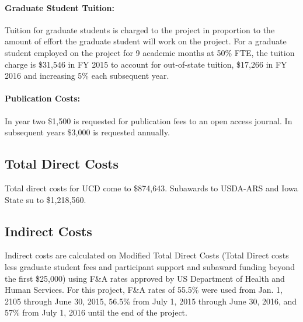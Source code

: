 \paragraph{Graduate Student Tuition:}
Tuition for graduate students is charged to the project in proportion to the amount of effort the graduate student will work on the project. For a graduate student employed on the project for 9 academic months at 50\% FTE, the tuition charge is \$31,546 in FY 2015 to account for out-of-state tuition, \$17,266 in FY 2016 and increasing 5\% each subsequent year.

\paragraph{Publication Costs:}
In year two \$1,500 is requested for publication fees to an open access journal.  In subsequent years \$3,000 is requested annually.

\subsection*{Total Direct Costs}

Total direct costs for UCD come to \$874,643.  Subawards to USDA-ARS and Iowa State su to \$1,218,560.

\subsection*{Indirect Costs}
Indirect costs are calculated on Modified Total Direct Costs (Total Direct costs less graduate student fees and participant support and subaward funding beyond the first \$25,000) using F\&A rates approved by US Department of Health and Human Services. For this project, F\&A rates of 55.5\% were used from Jan. 1, 2105 through June 30, 2015, 56.5\% from July 1, 2015 through June 30, 2016, and 57\% from July 1, 2016 until the end of the project.



